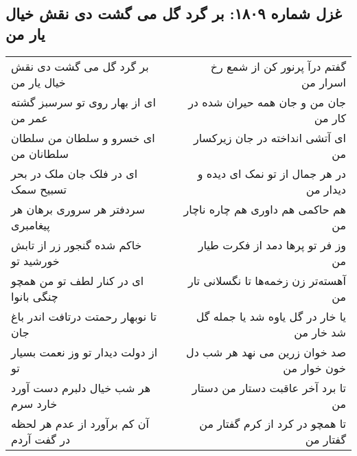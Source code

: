 \begin{center}
\section*{غزل شماره ۱۸۰۹: بر گرد گل می گشت دی نقش خیال یار من}
\label{sec:1809}
\begin{longtable}{l p{0.5cm} r}
بر گرد گل می گشت دی نقش خیال یار من
&&
گفتم درآ پرنور کن از شمع رخ اسرار من
\\
ای از بهار روی تو سرسبز گشته عمر من
&&
جان من و جان همه حیران شده در کار من
\\
ای خسرو و سلطان من سلطان سلطانان من
&&
ای آتشی انداخته در جان زیرکسار من
\\
ای در فلک جان ملک در بحر تسبیح سمک
&&
در هر جمال از تو نمک ای دیده و دیدار من
\\
سردفتر هر سروری برهان هر پیغامبری
&&
هم حاکمی هم داوری هم چاره ناچار من
\\
خاکم شده گنجور زر از تابش خورشید تو
&&
وز فر تو پرها دمد از فکرت طیار من
\\
ای در کنار لطف تو من همچو چنگی بانوا
&&
آهسته‌تر زن زخمه‌ها تا نگسلانی تار من
\\
تا نوبهار رحمتت درتافت اندر باغ جان
&&
یا خار در گل یاوه شد یا جمله گل شد خار من
\\
از دولت دیدار تو وز نعمت بسیار تو
&&
صد خوان زرین می نهد هر شب دل خون خوار من
\\
هر شب خیال دلبرم دست آورد خارد سرم
&&
تا برد آخر عاقبت دستار من دستار من
\\
آن کم برآورد از عدم هر لحظه در گفت آردم
&&
تا همچو در کرد از کرم گفتار من گفتار من
\\
\end{longtable}
\end{center}
